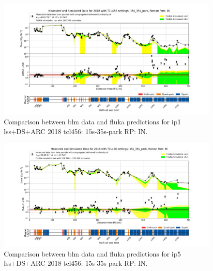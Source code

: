 \documentclass[encoding=utf8,british]{tumphthesis}
\begin{document}
\newpage

\begin{figure}[H]
    \centering
    \includegraphics[width=0.9\linewidth]{results/benchmark_IR1_2018_FULL_15s_35s_park_final.png}
    \caption{Comparison between \acrshort{blm} data and \acrshort{fluka} predictions for \acrshort{ip}1 \acrshort{lss}+DS+ARC 2018 \acrshort{tcl}456: 15s-35s-park RP: IN.}
    \label{fig:blm-benchmark-2018-full-IP1}
\end{figure}


\begin{figure}[H]
    \centering
    \includegraphics[width=0.9\linewidth]{results/2018_full_length_0_700m.png}
    \caption{Comparison between \acrshort{blm} data and \acrshort{fluka} predictions for \acrshort{ip}5 \acrshort{lss}+DS+ARC 2018 \acrshort{tcl}456: 15s-35s-park RP: IN.}
    \label{fig:blm-benchmark-2018-full-IP5}
\end{figure}
\end{document}
